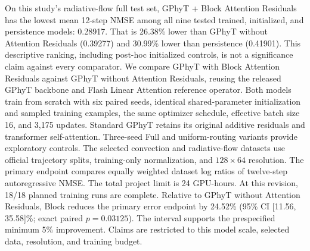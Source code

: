 On this study's radiative-flow full test set, GPhyT + Block Attention Residuals has the lowest mean 12-step NMSE among all nine tested trained, initialized, and persistence models: 0.28917. That is 26.38\% lower than GPhyT without Attention Residuals (0.39277) and 30.99\% lower than persistence (0.41901). This descriptive ranking, including post-hoc initialized controls, is not a significance claim against every comparator. We compare GPhyT with Block Attention Residuals against GPhyT without Attention Residuals, reusing the released GPhyT backbone and Flash Linear Attention reference operator. Both models train from scratch with six paired seeds, identical shared-parameter initialization and sampled training examples, the same optimizer schedule, effective batch size 16, and 3,175 updates. Standard GPhyT retains its original additive residuals and transformer self-attention. Three-seed Full and uniform-routing variants provide exploratory controls. The selected convection and radiative-flow datasets use official trajectory splits, training-only normalization, and $128\times64$ resolution. The primary endpoint compares equally weighted dataset log ratios of twelve-step autoregressive NMSE. The total project limit is 24 GPU-hours. At this revision, 18/18 planned training runs are complete. Relative to GPhyT without Attention Residuals, Block reduces the primary error endpoint by 24.52\% (95\% CI [11.56, 35.58]\%; exact paired $p=0.03125$). The interval supports the prespecified minimum 5\% improvement. Claims are restricted to this model scale, selected data, resolution, and training budget.
